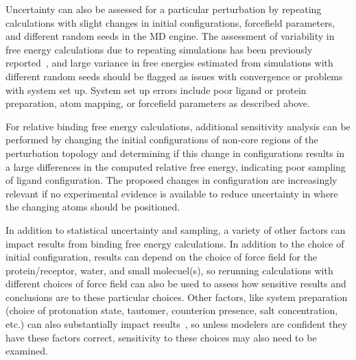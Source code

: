 \documentclass[9pt,bestpractices]{livecoms}
\begin{document}
Uncertainty can also be assessed for a particular perturbation by repeating calculations with slight changes in initial configurations, forcefield parameters, and different random seeds in the MD engine. 
The assessment of variability in free energy calculations due to repeating simulations has been previously reported~\cite{aldeghi2019accurate,paliwal2011benchmark}, and large variance in free energies estimated from simulations with different random seeds should be flagged as issues with convergence or problems with system set up. 
System set up errors include poor ligand or protein preparation, atom mapping, or forcefield parameters as described above.

For relative binding free energy calculations, additional sensitivity analysis can be performed by changing the initial configurations of non-core regions of the perturbation topology and determining if this change in configurations results in a large differences in the computed relative free energy, indicating poor sampling of ligand configuration.
The proposed changes in configuration are increasingly relevant if no experimental evidence is available to reduce uncertainty in where the changing atoms should be positioned.

In addition to statistical uncertainty and sampling, a variety of other factors can impact results from binding free energy calculations. In addition to the choice of initial configuration, results can depend on the choice of force field for the protein/receptor, water, and small molecuel(s), so rerunning calculations with different choices of force field can also be used to assess how sensitive results and conclusions are to these particular choices. Other factors, like system preparation (choice of protonation state, tautomer, counterion presence, salt concentration, etc.) can also substantially impact results~\cite{mobley2017predicting, mobley2017predictingb}, so unless modelers are confident they have these factors correct, sensitivity to these choices may also need to be examined.
\end{document}
